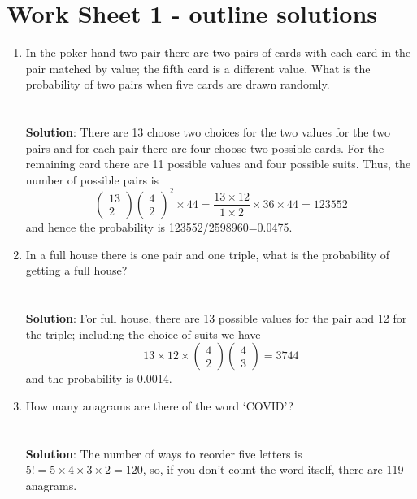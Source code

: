 \documentclass[11pt,a4paper]{scrartcl}
\begin{document}
\section*{Work Sheet 1 - outline solutions}

\begin{enumerate}

\item In the poker hand two pair there are two pairs of cards with
  each card in the pair matched by value; the fifth card is a
  different value. What is the probability of two pairs when five
  cards are drawn randomly.\\ \\ \\ \textbf{Solution}: There are 13 choose two choices
  for the two values for the two pairs and for each pair there are
  four choose two possible cards. For the remaining card there are 11
  possible values and four possible suits. Thus, the number of
  possible pairs is
\begin{equation}
\left(\begin{array}{c}13\\2\end{array}\right)\left(\begin{array}{c}4\\2\end{array}\right)^2\times 44
=
\frac{13\times 12}{1\times 2}\times 36\times 44=123552
\end{equation}
and hence the probability is 123552/2598960=0.0475.

\item In a full house there is one pair and one
  triple, what is the probability of getting a full
  house?\\ \\ \\ \textbf{Solution}: For full house,
there are 13 possible values for the pair and 12 for the triple; including the choice of suits we have
\begin{equation}
13\times 12 \times \left(\begin{array}{c}4\\2\end{array}\right)\left(\begin{array}{c}4\\3\end{array}\right)=3744
\end{equation}
and the probability is 0.0014.


\item How many anagrams are there of the word `COVID'?\\ \\ \\
  \textbf{Solution}: The number of ways to reorder five letters is $5!=5\times 4\times 3\times 2=120$, so, if you don't count the word itself, there are 119 anagrams.



\end{enumerate}
\end{document}
